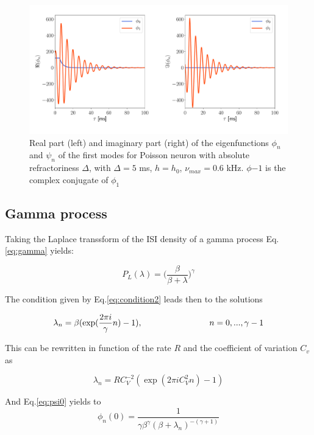 \documentclass[a4paper,11pt,twoside]{article}
\numberwithin{equation}{section}
\begin{document}
\begin{figure}[h!]
	\centering
	\includegraphics[width=0.8\linewidth]{poisson_eigenfunction2.pdf}
	\caption{Real part (left) and imaginary part (right) of the eigenfunctions $\phi_n$ and $\psi_n$ of the first modes for Poisson neuron with absolute refractoriness $\Delta$, with $\Delta=5$ ms, $h=h_0$, $\nu_{max}=0.6$ kHz. $\phi{-1}$ is the complex conjugate of $\phi_{1}$}
	\label{fig:poissoneigenfunction}
\end{figure}


\subsection{Gamma process}

Taking the Laplace transsform of the ISI density of a gamma process Eq. \eqref{eq:gamma} yields:

\begin{equation}
P_L(\lambda)=\big(\frac{\beta}{\beta +\lambda}\big)^\gamma
\end{equation}


The condition given by Eq.\eqref{eq:condition2} leads then to the solutions


\begin{equation}
\lambda_n=\beta(\exp(\frac{2\pi i}{\gamma}n)-1), \hspace{2.8cm}  n=0,..., \gamma-1
\end{equation}

This can be rewritten in function of the rate $R$ and the coefficient of variation $C_v$ as

\begin{equation}
\lambda_n=RC_V^{-2}(\exp(2\pi iC_V^2 n)-1)
\end{equation}

And Eq.\ref{eq:psi0} yields to
\begin{equation}
\phi_n(0)=\frac{1}{\gamma\beta^\gamma(\beta+\lambda_n)^{-(\gamma+1)}}
\end{equation}
\end{document}
